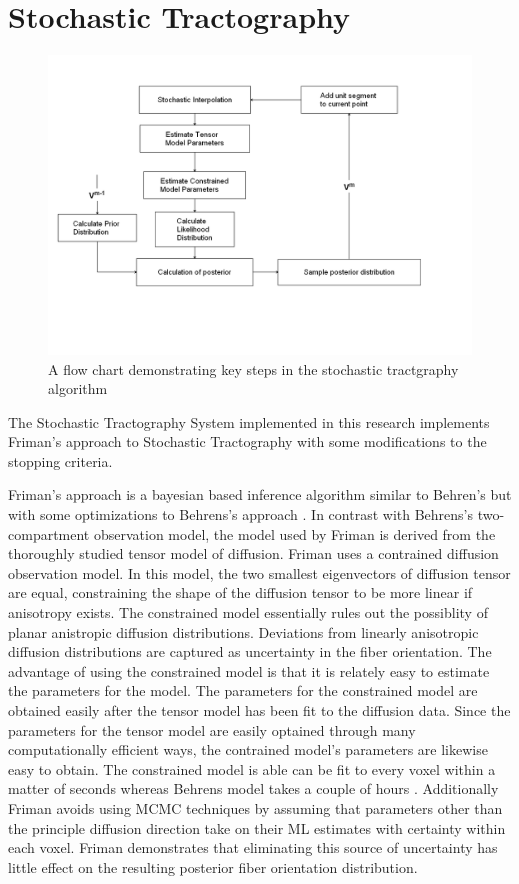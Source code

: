 \chapter{Stochastic Tractography}
\begin{figure} \label{fig:stflow}
	\includegraphics[width=\linewidth]{stflow}
	\caption{A flow chart demonstrating key steps in the stochastic tractgraphy algorithm}
\end{figure}
The Stochastic Tractography System implemented in this research implements Friman's \cite{frimanTMI06} approach to Stochastic Tractography with some modifications to the stopping criteria.

Friman's approach is a bayesian based inference algorithm similar to Behren's but with some optimizations to Behrens's approach \cite{frimanTMI06}.  In contrast with Behrens's two-compartment observation model, the model used by Friman is derived from the thoroughly studied tensor model of diffusion.  Friman uses a contrained diffusion observation model.  In this model, the two smallest eigenvectors of diffusion tensor are equal, constraining the shape of the diffusion tensor to be more linear if anisotropy exists.  The constrained model essentially rules out the possiblity of planar anistropic diffusion distributions.  Deviations from linearly anisotropic diffusion distributions are captured as uncertainty in the fiber orientation.  The advantage of using the constrained model is that it is relately easy to estimate the parameters for the model.  The parameters for the constrained model are obtained easily after the tensor model has been fit to the diffusion data.  Since the parameters for the tensor model are easily optained through many computationally efficient ways, the contrained model's parameters are likewise easy to obtain.  The constrained model is able can be fit to every voxel within a matter of seconds whereas Behrens model takes a couple of hours \cite{frimanTMI06}.  Additionally Friman avoids using MCMC techniques by assuming that parameters other than the principle diffusion direction take on their ML estimates with certainty within each voxel.  Friman demonstrates that eliminating this source of uncertainty has little effect on the resulting posterior fiber orientation distribution.

